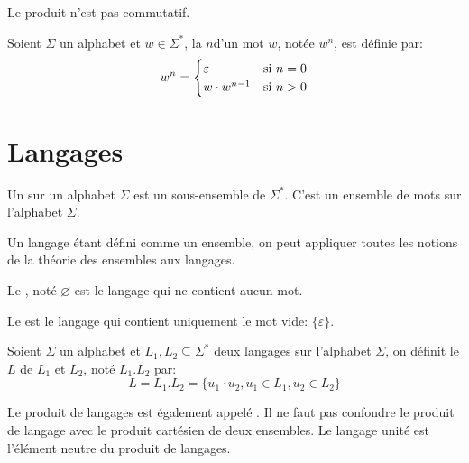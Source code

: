 Le produit n'est pas commutatif.

\begin{definition}
	Soient \( \Sigma \) un alphabet et \( w \in \Sigma^* \), la  \( n \)\ieme d'un mot \( w \), notée \( w^n \), est définie par:
	\[
		w^n =
		\begin{cases}
			\varepsilon     & \text{si \( n = 0\)} \\
			w \cdot w^{n-1} & \text{si \( n > 0\)}
		\end{cases}
	\]
\end{definition}


\section{Langages}

\begin{definition}
	Un  sur un alphabet \( \Sigma \) est un sous-ensemble de \( \Sigma^* \). C'est un ensemble de mots sur l'alphabet \( \Sigma \).
\end{definition}

Un langage étant défini comme un ensemble, on peut appliquer toutes les notions de la théorie des ensembles aux langages.

\begin{definition}
	Le , noté \( \varnothing \) est le langage qui ne contient aucun mot.
\end{definition}

\begin{definition}
	Le  est le langage qui contient uniquement le mot vide: \( \{ \varepsilon \} \).
\end{definition}


\begin{definition}
	Soient \( \Sigma \) un alphabet et \( L_1, L_2 \subseteq \Sigma^* \) deux langages sur l'alphabet \( \Sigma \), on définit le  \( L \) de \( L_1 \) et \( L_2 \), noté \( L_1 . L_2 \) par:
	\begin{equation}
		L = L_1 . L_2 = \{ u_1 \cdot u_2, u_1 \in L_1, u_2 \in L_2 \}
	\end{equation}
\end{definition}

Le produit de langages est également appelé . Il ne faut pas confondre le produit de langage avec le produit cartésien de deux ensembles. Le langage unité est l'élément neutre du produit de langages.

